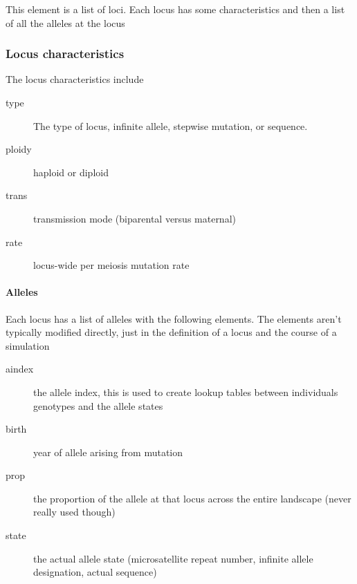 \documentclass[10pt]{article}
\begin{document}
This element is a list of loci.  Each locus has some characteristics
and then a list of all the alleles at the locus

\subsubsection{Locus characteristics}
\label{sec:locus-char}
The locus characteristics include
\begin{description}
\item[type] The type of locus, infinite allele, stepwise mutation, or sequence.
\item[ploidy] haploid or diploid
\item[trans] transmission mode (biparental versus maternal)
\item[rate] locus-wide per meiosis mutation rate
\end{description}
\paragraph{Alleles}
\label{sec:alleles}
Each locus has a list of alleles with the following elements.  The
elements aren't typically modified directly, just in the definition of
a locus and the course of a simulation
\begin{description}
\item[aindex] the allele index, this is used to create lookup tables
  between individuals genotypes and the allele states
\item[birth] year of allele arising from mutation
\item[prop] the proportion of the allele at that locus across the
  entire landscape (never really used though)
\item[state] the actual allele state (microsatellite repeat number, infinite
  allele designation, actual sequence)
\end{description}
\end{document}
